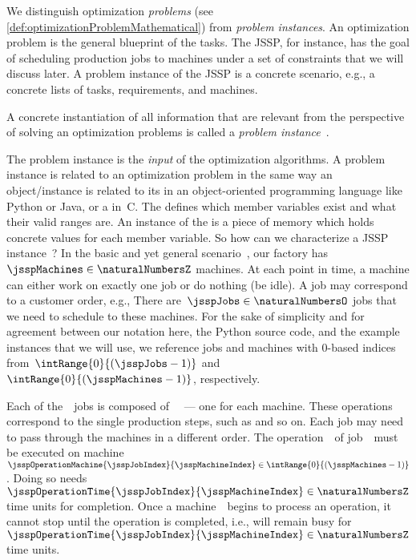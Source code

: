 %
\label{sec:problemInstance}%
%
%
%
We distinguish optimization \emph{problems} (see \autoref{def:optimizationProblemMathematical}) from \emph{problem instances}.
An optimization problem is the general blueprint of the tasks.
The \gls{JSSP}, for instance, has the goal of scheduling production jobs to machines under a set of constraints that we will discuss later.
A problem instance of the \gls{JSSP} is a concrete scenario, e.g., a concrete lists of tasks, requirements, and machines.%
%
\begin{definition}%
\label{def:instance}%
A concrete instantiation of all information that are relevant from the perspective of solving an optimization problems is called a \emph{problem instance}~\instance.%
\end{definition}%
%
The problem instance is the \emph{input} of the optimization algorithms.
A problem instance is related to an optimization problem in the same way an object/instance is related to its  in an object-oriented programming language like Python or Java, or a  in~C.
The  defines which member variables exist and what their valid ranges are.
An instance of the  is a piece of memory which holds concrete values for each member variable.%
%
\endhsection%
%
%
\label{sec:jsspInstance}%
%
%
\label{sec:jsspInstanceStructure}%
%
So how can we characterize a \gls{JSSP} instance~\instance?
In the basic and yet general scenario~\cite{GLLRK1979OAAIDSASAS,LLRKS1993SASAAC,L1982RRITTOMS,T1993BFBSP}, our factory has~$\jsspMachines\in\naturalNumbersZ$ machines.
At each point in time, a machine can either work on exactly one job or do nothing (be idle).
A job may correspond to a customer order, e.g., 
There are~$\jsspJobs\in\naturalNumbersO$ jobs that we need to schedule to these machines.
For the sake of simplicity and for agreement between our notation here, the Python source code, and the example instances that we will use, we reference jobs and machines with 0\nobreakdash-based indices from~$\intRange{0}{(\jsspJobs-1)}$ and~$\intRange{0}{(\jsspMachines-1)}$, respectively.

Each of the~\jsspJobs\ jobs is composed of~\jsspMachines\  --- one for each machine.
These operations correspond to the single production steps, such as   and so on.
Each job may need to pass through the machines in a different order.
The operation~\jsspMachineIndex\ of job~\jsspJobIndex\ must be executed on machine~$\jsspOperationMachine{\jsspJobIndex}{\jsspMachineIndex}\in \intRange{0}{(\jsspMachines-1)}$.
Doing so needs~$\jsspOperationTime{\jsspJobIndex}{\jsspMachineIndex}\in\naturalNumbersZ$ time units for completion.
Once a machine~\jsspMachineIndex\ begins to process an operation, it cannot stop until the operation is completed, i.e., will remain busy for~$\jsspOperationTime{\jsspJobIndex}{\jsspMachineIndex}\in\naturalNumbersZ$ time units.

